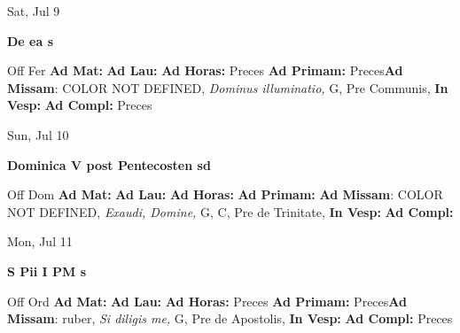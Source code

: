 \documentclass[10pt]{memoir}
\begin{document}
\begin{center}
\begin{minipage}{3.5in}
\vspace{2em}
\begin{center}Sat, Jul 9
\end{center}
\textbf{ \large De ea
\textnormal{\normalsize s}}

\begin{justify}Off Fer
\textbf{Ad Mat: }
\textbf{Ad Lau: }
\textbf{Ad Horas: }Preces
\textbf{Ad Primam: }Preces\textbf{Ad Missam}: COLOR NOT DEFINED, \textit{Dominus illuminatio,} G, Pre Communis, 
\textbf{In Vesp: }
\textbf{Ad Compl: }Preces
\end{justify}
\end{minipage}
\end{center}

\begin{center}
\begin{minipage}{3.5in}
\vspace{2em}
\begin{center}Sun, Jul 10
\end{center}
\textbf{ \large Dominica V post Pentecosten
\textnormal{\normalsize sd}}

\begin{justify}Off Dom
\textbf{Ad Mat: }
\textbf{Ad Lau: }
\textbf{Ad Horas: }
\textbf{Ad Primam: }\textbf{Ad Missam}: COLOR NOT DEFINED, \textit{Exaudi, Domine,} G, C, Pre de Trinitate, 
\textbf{In Vesp: }
\textbf{Ad Compl: }
\end{justify}
\end{minipage}
\end{center}

\begin{center}
\begin{minipage}{3.5in}
\vspace{2em}
\begin{center}Mon, Jul 11
\end{center}
\textbf{ \large S Pii I PM
\textnormal{\normalsize s}}

\begin{justify}Off Ord
\textbf{Ad Mat: }
\textbf{Ad Lau: }
\textbf{Ad Horas: }Preces
\textbf{Ad Primam: }Preces\textbf{Ad Missam}: ruber, \textit{Si diligis me,} G, Pre de Apostolis, 
\textbf{In Vesp: }
\textbf{Ad Compl: }Preces
\end{justify}
\end{minipage}
\end{center}
\end{document}
